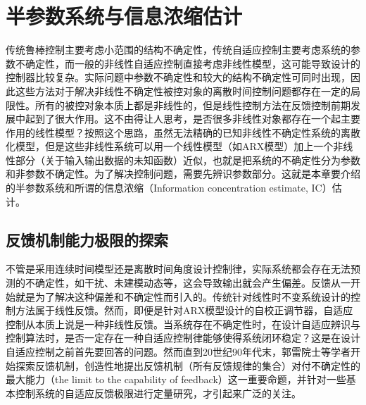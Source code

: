 \chapter{半参数系统与信息浓缩估计}\label{chap:2}

传统鲁棒控制主要考虑小范围的结构不确定性，传统自适应控制主要考虑系统的参数不确定性，而一般的非线性自适应控制直接考虑非线性模型，这可能导致设计的控制器比较复杂。实际问题中参数不确定性和较大的结构不确定性可同时出现，因此这些方法对于解决非线性不确定性被控对象的离散时间控制问题都存在一定的局限性。所有的被控对象本质上都是非线性的，但是线性控制方法在反馈控制前期发展中起到了很大作用。这不由得让人思考，是否很多非线性对象都存在一个起主要作用的线性模型？按照这个思路，虽然无法精确的已知非线性不确定性系统的离散化模型，但是这些非线性系统可以用一个线性模型（如ARX模型）加上一个非线性部分（关于输入输出数据的未知函数）近似，也就是把系统的不确定性分为参数和非参数不确定性。为了解决控制问题，需要先辨识参数部分。这就是本章要介绍的半参数系统和所谓的信息浓缩（Information concentration estimate, IC）估计。

\section{反馈机制能力极限的探索}\label{sect:2.1}
不管是采用连续时间模型还是离散时间角度设计控制律，实际系统都会存在无法预测的不确定性，如干扰、未建模动态等，这会导致输出就会产生偏差。反馈从一开始就是为了解决这种偏差和不确定性而引入的。传统针对线性时不变系统设计的控制方法属于线性反馈。然而，即便是针对ARX模型设计的自校正调节器，自适应控制从本质上说是一种非线性反馈。当系统存在不确定性时，在设计自适应辨识与控制算法时，是否一定存在一种自适应控制律能够使得系统闭环稳定？这是在设计自适应控制之前首先要回答的问题。然而直到20世纪90年代末，郭雷院士等学者开始探索反馈机制，创造性地提出反馈机制（所有反馈规律的集合）对付不确定性的最大能力（the limit to the capability of feedback）这一重要命题，并针对一些基本控制系统的自适应反馈极限进行定量研究，才引起来广泛的关注。


